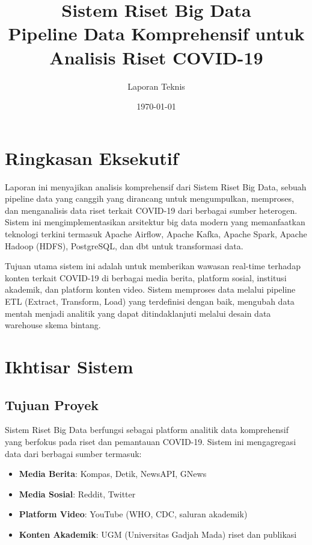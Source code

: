 \documentclass[12pt,a4paper]{article}
\title{\Huge\textbf{Sistem Riset Big Data}\\[0.5cm]
\Large Pipeline Data Komprehensif untuk Analisis Riset COVID-19}
\author{Laporan Teknis}
\date{\today}
\begin{document}
\maketitle
\thispagestyle{empty}

\newpage
\tableofcontents
\newpage

\section{Ringkasan Eksekutif}

Laporan ini menyajikan analisis komprehensif dari Sistem Riset Big Data, sebuah pipeline data yang canggih yang dirancang untuk mengumpulkan, memproses, dan menganalisis data riset terkait COVID-19 dari berbagai sumber heterogen. Sistem ini mengimplementasikan arsitektur big data modern yang memanfaatkan teknologi terkini termasuk Apache Airflow, Apache Kafka, Apache Spark, Apache Hadoop (HDFS), PostgreSQL, dan dbt untuk transformasi data.

Tujuan utama sistem ini adalah untuk memberikan wawasan real-time terhadap konten terkait COVID-19 di berbagai media berita, platform sosial, institusi akademik, dan platform konten video. Sistem memproses data melalui pipeline ETL (Extract, Transform, Load) yang terdefinisi dengan baik, mengubah data mentah menjadi analitik yang dapat ditindaklanjuti melalui desain data warehouse skema bintang.

\section{Ikhtisar Sistem}

\subsection{Tujuan Proyek}
Sistem Riset Big Data berfungsi sebagai platform analitik data komprehensif yang berfokus pada riset dan pemantauan COVID-19. Sistem ini mengagregasi data dari berbagai sumber termasuk:

\begin{itemize}
    \item \textbf{Media Berita}: Kompas, Detik, NewsAPI, GNews
    \item \textbf{Media Sosial}: Reddit, Twitter
    \item \textbf{Platform Video}: YouTube (WHO, CDC, saluran akademik)
    \item \textbf{Konten Akademik}: UGM (Universitas Gadjah Mada) riset dan publikasi
\end{itemize}
\end{document}
